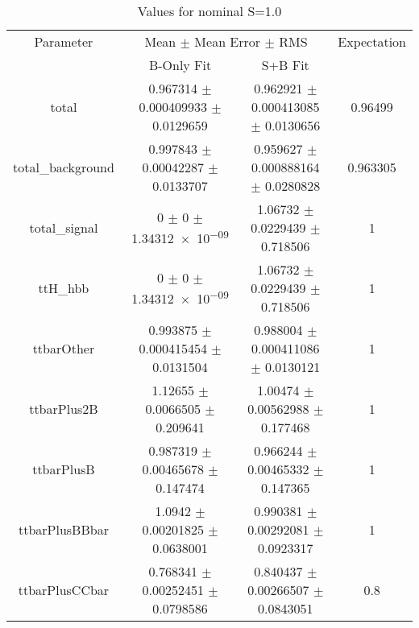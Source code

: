 \begin{table}
\centering
\caption{Values for nominal S=1.0}
\begin{tabular}{cccc}
\toprule
Parameter & \multicolumn{2}{c}{Mean $\pm$ Mean Error $\pm$ RMS} & Expectation\\
 & B-Only Fit & S+B Fit & \\
\midrule
total & \num{0.967314} $\pm$ \num{0.000409933} $\pm$ \num{0.0129659} & \num{0.962921} $\pm$ \num{0.000413085} $\pm$ \num{0.0130656} & \num{0.96499}\\
total\_background & \num{0.997843} $\pm$ \num{0.00042287} $\pm$ \num{0.0133707} & \num{0.959627} $\pm$ \num{0.000888164} $\pm$ \num{0.0280828} & \num{0.963305}\\
total\_signal & \num{0} $\pm$ \num{0} $\pm$ \num{1.34312e-09} & \num{1.06732} $\pm$ \num{0.0229439} $\pm$ \num{0.718506} & \num{1}\\
ttH\_hbb & \num{0} $\pm$ \num{0} $\pm$ \num{1.34312e-09} & \num{1.06732} $\pm$ \num{0.0229439} $\pm$ \num{0.718506} & \num{1}\\
ttbarOther & \num{0.993875} $\pm$ \num{0.000415454} $\pm$ \num{0.0131504} & \num{0.988004} $\pm$ \num{0.000411086} $\pm$ \num{0.0130121} & \num{1}\\
ttbarPlus2B & \num{1.12655} $\pm$ \num{0.0066505} $\pm$ \num{0.209641} & \num{1.00474} $\pm$ \num{0.00562988} $\pm$ \num{0.177468} & \num{1}\\
ttbarPlusB & \num{0.987319} $\pm$ \num{0.00465678} $\pm$ \num{0.147474} & \num{0.966244} $\pm$ \num{0.00465332} $\pm$ \num{0.147365} & \num{1}\\
ttbarPlusBBbar & \num{1.0942} $\pm$ \num{0.00201825} $\pm$ \num{0.0638001} & \num{0.990381} $\pm$ \num{0.00292081} $\pm$ \num{0.0923317} & \num{1}\\
ttbarPlusCCbar & \num{0.768341} $\pm$ \num{0.00252451} $\pm$ \num{0.0798586} & \num{0.840437} $\pm$ \num{0.00266507} $\pm$ \num{0.0843051} & \num{0.8}\\
\bottomrule
\end{tabular}
\end{table}